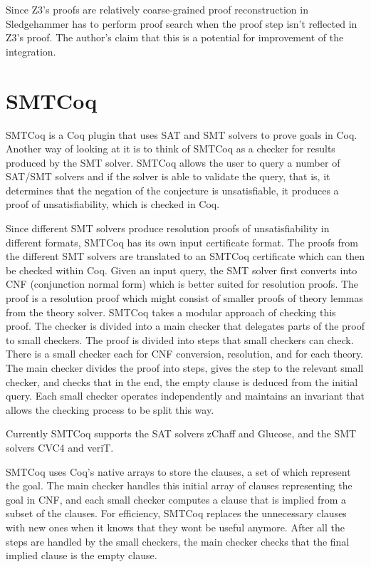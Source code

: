 \documentclass{article}
\begin{document}
		Since Z3's proofs are relatively coarse-grained
		proof reconstruction in Sledgehammer has to perform
		proof search when the proof step isn't reflected 
		in Z3's proof. The author's claim that this is 
		a potential for improvement of the integration.
		
\section{SMTCoq}
\label{sec:cert}
	SMTCoq is a Coq plugin that uses SAT and SMT solvers to 
	prove goals in Coq. Another way of looking at it is 
	to think of SMTCoq as a checker for results produced 
	by the SMT solver. SMTCoq allows the user to query 
	a number of SAT/SMT solvers and if the solver is able 
	to validate the query, that is, it determines that 
	the negation of the conjecture is unsatisfiable, it 
	produces a proof of unsatisfiability, which is checked 
	in Coq.
	
	Since different SMT solvers produce resolution 
	proofs of unsatisfiability in different formats, 
	SMTCoq has its own input certificate format. 
	The proofs from the different SMT solvers are 
	translated to an SMTCoq certificate which 
	can then be checked within Coq. Given an input 
	query, the SMT solver first converts into CNF
	(conjunction normal form) which is better 
	suited for resolution proofs. The proof is a 
	resolution proof which might consist of smaller proofs 
	of theory lemmas from the theory solver. 
	SMTCoq takes a modular approach of checking this proof.
	The checker is divided into a main checker that 
	delegates parts of the proof to small checkers. The proof 
	is divided into steps that small checkers can check.
	There is a small checker each for CNF conversion, 
	resolution, and for each theory. The main checker divides the 
	proof into steps, gives the step to the relevant small 
	checker, and checks that in the end, the empty 
	clause is deduced from the initial query. Each small 
	checker operates independently and maintains an invariant
	that allows the checking process to be split this way.
	
	Currently SMTCoq supports the SAT solvers zChaff and Glucose, 
	and the SMT solvers CVC4 and veriT. 
	
	SMTCoq uses Coq's native arrays to store the clauses, 
	a set of which represent the goal. The main checker 
	handles this initial array of clauses representing the 
	goal in CNF, and each small checker computes a 
	clause that is implied from a subset of the clauses.
	For efficiency, SMTCoq replaces the unnecessary 
	clauses with new ones when it knows that they 
	wont be useful anymore. After all the steps 
	are handled by the small checkers, the main 
	checker checks that the final implied clause is 
	the empty clause.
	
\end{document}
